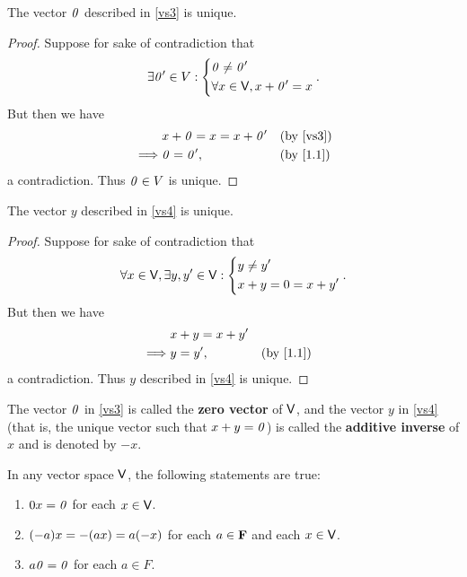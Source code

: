 \begin{cor}\label{1.2.14}
  The vector \(\mathit{0}\) described in \ref{vs3} is unique.
\end{cor}

\begin{proof}
  Suppose for sake of contradiction that
  \[
    \exists \mathit{0}' \in V : \begin{dcases}
      \mathit{0} \neq \mathit{0}' \\
      \forall x \in \mathsf{V}, x + \mathit{0}' = x
    \end{dcases}.
  \]
  But then we have
  \begin{align*}
             & x + \zv = x = x + \zv' &  & \text{(by \ref{vs3})}  \\
    \implies & \zv = \zv',            &  & \text{(by \cref{1.1})}
  \end{align*}
  a contradiction.
  Thus \(\mathit{0} \in V\) is unique.
\end{proof}

\begin{cor}\label{1.2.15}
  The vector \(y\) described in \ref{vs4} is unique.
\end{cor}

\begin{proof}
  Suppose for sake of contradiction that
  \[
    \forall x \in \mathsf{V}, \exists y, y' \in \mathsf{V} : \begin{dcases}
      y \neq y' \\
      x + y = 0 = x + y'
    \end{dcases}.
  \]
  But then we have
  \begin{align*}
             & x + y = x + y'                             \\
    \implies & y = y',        &  & \text{(by \cref{1.1})}
  \end{align*}
  a contradiction.
  Thus \(y\) described in \ref{vs4} is unique.
\end{proof}

\begin{defn}\label{1.2.16}
  The vector \(\mathit{0}\) in \ref{vs3} is called the \textbf{zero vector} of \(\mathsf{V}\), and the vector \(y\) in \ref{vs4} (that is, the unique vector such that \(x + y = \mathit{0}\)) is called the \textbf{additive inverse} of \(x\) and is denoted by \(-x\).
\end{defn}

\begin{thm}\label{1.2}
  In any vector space \(\mathsf{V}\), the following statements are true:
  \begin{enumerate}
    \item \(0x = \mathit{0}\) for each \(x \in \mathsf{V}\).
    \item \(\p{-a}x = -\p{ax} = a\p{-x}\) for each \(a \in \mathbf{F}\) and each \(x \in \mathsf{V}\).
    \item \(a\mathit{0} = \mathit{0}\) for each \(a \in F\).
  \end{enumerate}
\end{thm}

